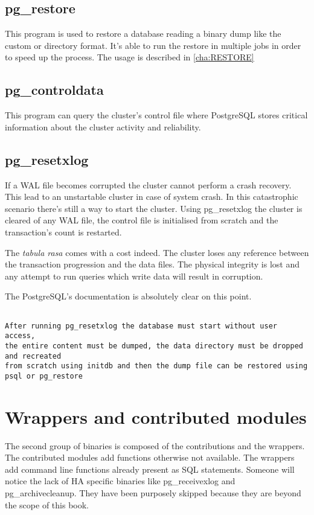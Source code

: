 \subsection{pg\_restore}
This program is used to restore a database reading a binary dump like the custom or directory 
format. It's able to run the restore in multiple jobs in order to speed up the process. The usage 
is described in \ref{cha:RESTORE}

\subsection{pg\_controldata}\label{sub:PGCONTROLDATA}
This program can query the cluster's control file where PostgreSQL stores critical information about 
the cluster activity and reliability. 

\subsection{pg\_resetxlog}
If a WAL file becomes corrupted the cluster cannot perform a crash recovery. This lead to an
unstartable cluster in case of system crash. In this catastrophic scenario there's still a 
way to start the cluster. Using pg\_resetxlog the cluster is cleared of any WAL file, the  
control file is initialised from scratch and the transaction's count is restarted.\newline

The \textit{tabula rasa} comes with a cost indeed. The cluster loses any reference between the 
transaction progression and the data files. The physical integrity is lost and any attempt to run 
queries which write data will result in corruption.\newline 

The PostgreSQL's documentation is absolutely clear on this point.

\begin{verbatim}

After running pg_resetxlog the database must start without user access, 
the entire content must be dumped, the data directory must be dropped and recreated 
from scratch using initdb and then the dump file can be restored using psql or pg_restore
\end{verbatim}

\section{Wrappers and contributed modules}
The second group of binaries is composed of the contributions and the wrappers. The 
contributed modules add functions otherwise not available. The wrappers add command line 
functions already present as SQL statements. Someone will notice the lack of HA specific binaries 
like pg\_receivexlog and pg\_archivecleanup. They have been purposely skipped because they are beyond the 
scope of this book.

